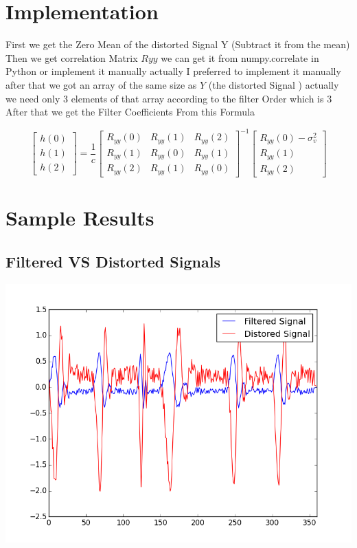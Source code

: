 \documentclass{article}
\begin{document}
\section{Implementation}
First we get the Zero Mean of the distorted Signal Y (Subtract it from the mean)
Then we get correlation Matrix $Ryy$  we can get it from numpy.correlate in Python or implement it manually actually I preferred to implement it manually 
after that we got an array of the same size as $Y$ (the distorted Signal ) actually we need only 3 elements of that array according to the filter Order which is 3 
After that we get the Filter Coefficients From this Formula


\begin{equation}
\begin{bmatrix} h(0)\\ h(1)\\  h(2) \end{bmatrix}
=\frac{1}{c}
\begin{bmatrix}
R_{yy}(0) & R_{yy}(1) & R_{yy}(2)\\
R_{yy}(1) & R_{yy}(0) & R_{yy}(1)\\
R_{yy}(2) & R_{yy}(1) & R_{yy}(0) 
\end{bmatrix}^{-1}
\begin{bmatrix}
R_{yy}(0) -\sigma_{v}^2 \\
R_{yy}(1) \\
R_{yy}(2)  
\end{bmatrix}
\end{equation}

\section{Sample Results}
\subsection{Filtered VS Distorted Signals}

\includegraphics[scale=0.8]{filtered_and_distorted_signals.png}
\end{document}
